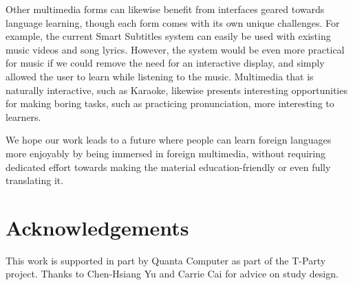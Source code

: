 \documentclass{sigchi}
\begin{document}
Other multimedia forms can likewise benefit from interfaces geared
towards language learning, though each form comes with its own
unique challenges. For example, the current Smart Subtitles system can
easily be used with existing music videos and song lyrics.
However, the system would be even more practical for music if
we could remove the need for an interactive display, and simply
allowed the user to learn while listening to the music.
Multimedia that is naturally interactive, such as Karaoke,
likewise presents interesting opportunities for
making boring tasks, such as practicing pronunciation, more interesting
to learners.

We hope our work leads to a future where people can learn foreign languages more enjoyably by being immersed in foreign multimedia, without requiring dedicated effort towards making the material education-friendly or even fully translating it.

\section{Acknowledgements}

This work is supported in part by Quanta Computer as 
part of the T-Party project. Thanks to Chen-Hsiang Yu and Carrie Cai for advice
on study design.

\balance





\end{document}
